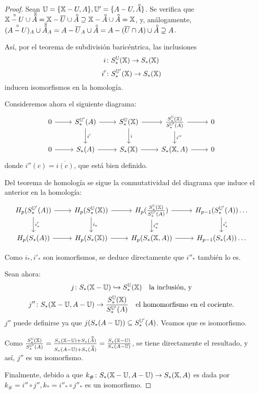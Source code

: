 \begin{proof}
  Sean $\U = \{\X - U, A\}, \U' = \{A - U, \interior{A}\}$. Se verifica que $\interior{\X-U} \cup \interior{\interior{A}} = \X - \overline{U} \cup \interior{A}
  \supseteq \X - \interior{A} \cup \interior{A} = \X$, y, análogamente, $(\interior{A - U})_A \cup \interior{\interior{A}}_A = A - \overline{U}_A \cup \interior{A} =
  A - (\overline{U} \cap A) \cup \interior{A} \supseteq A$.

  Así, por el teorema de subdivisión baricéntrica, las inclusiones
  \[i \colon S_*^{\mathbb U}({\mathbb X}) \to S_*({\mathbb X}) \]
  \[i' \colon S_*^{{\mathbb U}'}({\mathbb X}) \to S_*({\mathbb X}) \]
  inducen isomorfismos en la homología.

  Consideremos ahora el siguiente diagrama:
  \[ \begin{tikzcd}
  0 \arrow{r} & S_*^{\U'}(A) \arrow{r} \arrow{d}{i'} & S_*^{\U}(\X) \arrow{r} \arrow{d}{i} & \frac{S_*^{\U}(\X)}{S_*^{\U'}(A)} \arrow{r} \arrow{d}{i''} & 0 \\
  0 \arrow{r} & S_*(A) \arrow{r} & S_*(\X) \arrow{r} & S_*(\X, A) \arrow{r} & 0
  \end{tikzcd} \]
  donde $i''(c) = \overline{i(c)}$, que está bien definido.

  Del teorema de homología se sigue la conmutatividad del diagrama que induce el anterior en la homología:
  \[ \begin{tikzcd}
  H_p(S_*^{\U'}(A)) \arrow{r} \arrow{d}{i'_*} & H_p(S_*^{\U}(\X)) \arrow{r} \arrow{d}{i_*} & H_p(\frac{S_*^{\U}(\X)}{S_*^{\U'}(A)}) \arrow{r} \arrow{d}{i''_*} & H_{p-1}(S_*^{\U'}(A)) \arrow{d}{i'_*} \dots \\
  H_p(S_*(A)) \arrow{r} & H_p(S_*(\X)) \arrow{r} & H_p(S_*(\X, A)) \arrow{r} & H_{p-1}(S_*(A)) \dots
  \end{tikzcd} \]

  Como $i_*, i'_*$ son isomorfismos, se deduce directamente que $i''_*$ también lo es.

  Sean ahora:
  \[j \colon S_*({\mathbb X} - {\mathbb U}) \xhookrightarrow{}   S_*^{\mathbb U}({\mathbb X}) \quad \text{la inclusión, y} \]
  \[j'' \colon S_*({\mathbb X} - {\mathbb U}, A - {\mathbb U}) \to \frac{S_*^{{\mathbb U}}({\mathbb X})}{S_*^{{\mathbb U}'}(A)} \quad \text{el homomorfismo en el cociente.}\]
  $j''$ puede definirse ya que $j(S_*(A - {\mathbb U})) \subseteq S_*^{{\mathbb U}'}(A)$. Veamos que es isomorfismo.

  Como $\frac{S_*^{\U}(\X)}{S_*^{\U'}(A)} = \frac{S_*(\X - \U) + S_*(\interior{A})}{S_*(A - \U) + S_*(\interior{A})} = \frac{S_*(\X-\U)}{S_*(A-\U)}$, se tiene
  directamente el resultado, y así, $j''$ es un isomorfismo.

  Finalmente, debido a que $k_\# \colon S_*({\mathbb X}-{\mathbb U}, A-{\mathbb U}) \to S_*({\mathbb X}, A)$ es dada por $k_\# = i'' \circ j'', k_* = i''_* \circ j''_*$ es un isomorfismo.
\end{proof}

